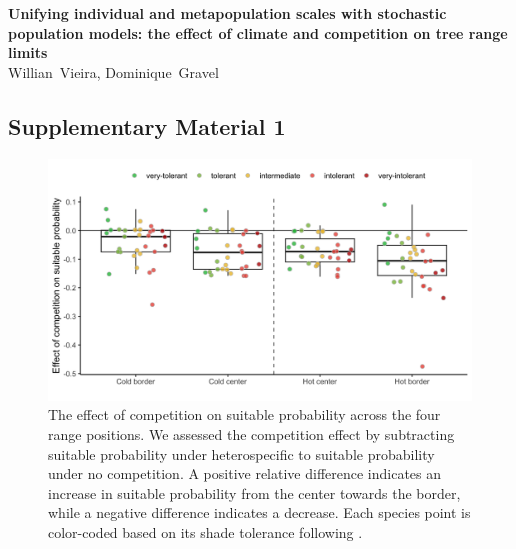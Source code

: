 \graphicspath{{chapter3/}{manuscript/}}

\begin{center}
\textbf{Unifying individual and metapopulation scales with stochastic
population models: the effect of climate and competition on tree range
limits} \\
Willian~Vieira, Dominique~Gravel
\end{center}

\hypertarget{supplementary-material-1}{%
\subsection{Supplementary Material 1}\label{supplementary-material-1}}

\hypertarget{fig:figsupp1}{%
\begin{figure}
\centering
\includegraphics{manuscript/figs/fig-effect_of_comp-1.png}
\caption[{The effect of competition on suitable probability across the
four range positions.}]{The effect of competition on suitable
probability across the four range positions. We assessed the competition
effect by subtracting suitable probability under heterospecific to
suitable probability under no competition. A positive relative
difference indicates an increase in suitable probability from the center
towards the border, while a negative difference indicates a decrease.
Each species point is color-coded based on its shade tolerance following
\citet{burns1990silvics}.}
\label{fig:figsupp1}
\end{figure}
}

\newpage

